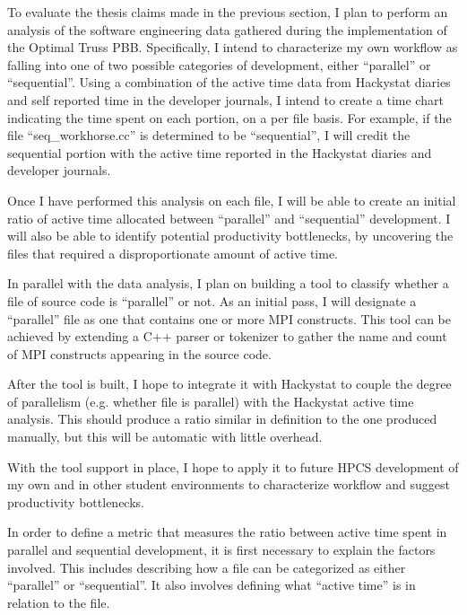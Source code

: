 \label{sec:methodology}

To evaluate the thesis claims made in the previous section, I plan to
perform an analysis of the software engineering data gathered during
the implementation of the Optimal Truss PBB.  Specifically, I intend
to characterize my own workflow as falling into one of two possible
categories of development, either ``parallel'' or ``sequential''.
Using a combination of the active time data from Hackystat diaries and
self reported time in the developer journals, I intend to create a
time chart indicating the time spent on each portion, on a per file
basis.  For example, if the file ``seq\_workhorse.cc'' is determined
to be ``sequential'', I will credit the sequential portion with the
active time reported in the Hackystat diaries and developer journals.

Once I have performed this analysis on each file, I will be able to
create an initial ratio of active time allocated between ``parallel''
and ``sequential'' development.  I will also be able to identify
potential productivity bottlenecks, by uncovering the files that
required a disproportionate amount of active time.

In parallel with the data analysis, I plan on building a tool to
classify whether a file of source code is ``parallel'' or not.  As an
initial pass, I will designate a ``parallel'' file as one that
contains one or more MPI constructs.  This tool can be achieved by
extending a C++ parser or tokenizer to gather the name and count of
MPI constructs appearing in the source code.

After the tool is built, I hope to integrate it with Hackystat to
couple the degree of parallelism (e.g. whether file is parallel) with
the Hackystat active time analysis.  This should produce a ratio
similar in definition to the one produced manually, but this will be
automatic with little overhead.

With the tool support in place, I hope to apply it to future HPCS
development of my own and in other student environments to
characterize workflow and suggest productivity bottlenecks.

\label{sec:dopatmetric}
In order to define a metric that measures the ratio between active
time spent in parallel and sequential development, it is first
necessary to explain the factors involved.  This includes describing
how a file can be categorized as either ``parallel'' or
``sequential''.  It also involves defining what ``active time'' is in
relation to the file.

